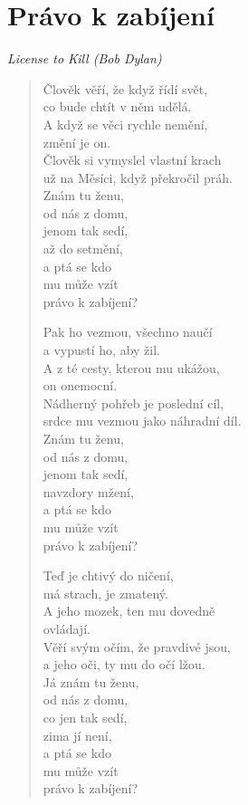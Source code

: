 \section*{Právo k zabíjení}

\textit{License to Kill (Bob Dylan)}

\begin{verse}
 Člověk věří, že když řídí svět,\\ 
 co bude chtít v něm udělá.\\
 A když se věci rychle nemění, \\
 změní je on.\\
 Člověk si vymyslel vlastní krach\\
 už na Měsíci, když překročil práh.\\
 Znám tu ženu,\\
 od nás z domu,\\
 jenom tak sedí,\\
 až do setmění,\\
 a ptá se kdo \\
 mu může vzít \\
 právo k zabíjení?
 
 Pak ho vezmou, všechno naučí \\
 a vypustí ho, aby žil. \\
 A z té cesty, kterou mu ukážou,  \\
 on onemocní. \\
 Nádherný pohřeb je poslední cíl, \\
 srdce mu vezmou jako náhradní díl. \\
 Znám tu ženu, \\
 od nás z domu, \\
 jenom tak sedí, \\
 navzdory mžení, \\
 a ptá se kdo \\
 mu může vzít \\
 právo k zabíjení?
 
 Teď je chtivý do ničení, \\
 má strach, je zmatený. \\
 A jeho mozek, ten mu dovedně \\
 ovládají. \\
 Věří svým očím, že pravdivé jsou, \\
 a jeho oči, ty mu do očí lžou. \\
 Já znám tu ženu, \\
 od nás z domu, \\
 co jen tak sedí, \\
 zima jí není, \\
 a ptá se kdo \\
 mu může vzít \\
 právo k zabíjení?
 

\end{verse}
